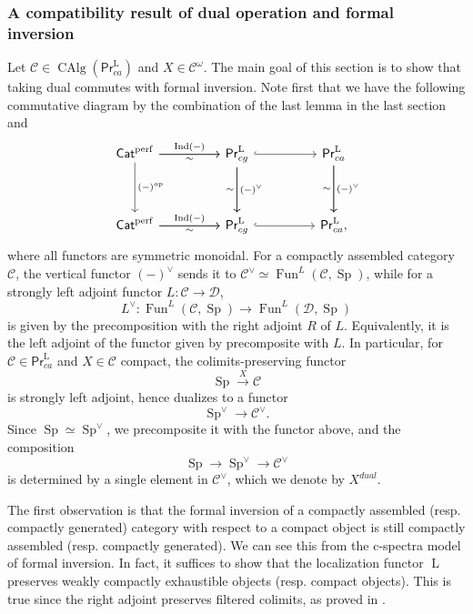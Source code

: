 \documentclass{article}
\theoremstyle{definition}
\newcommand{\on}{\operatorname}
\newcommand{\PrL}{\mathsf{Pr}^\mathrm{L} }
\begin{document}
\subsubsection{A compatibility result of dual operation and formal inversion}\label{compactibility}
Let $\mathcal{C}\in\on{CAlg}(\PrL_{ca})$ and $X\in\mathcal{C}^{\omega}$. The main goal of this section is to show that taking dual commutes with formal inversion. Note first that we have the following commutative diagram by the combination of the last lemma in the last section and \cite[Construction 2.9.21]{KNP}
\[\begin{tikzcd}
	{\mathsf{Cat}^{\on{perf}}} && {\PrL_{cg}} && {\PrL_{ca}} \\
	\\
	{\mathsf{Cat}^{\on{perf}}} && {\PrL_{cg}} && {\PrL_{ca}}
	\arrow["{\on{Ind}(-)}", from=1-1, to=1-3]
	\arrow["\sim"', from=1-1, to=1-3]
	\arrow["{(-)^{op}}", from=1-1, to=3-1]
	\arrow[hook, from=1-3, to=1-5]
	\arrow["{(-)^\vee}", from=1-3, to=3-3]
	\arrow["\sim"', from=1-3, to=3-3]
	\arrow["{(-)^\vee}", from=1-5, to=3-5]
	\arrow["\sim"', from=1-5, to=3-5]
	\arrow["{\on{Ind}(-)}", from=3-1, to=3-3]
	\arrow["\sim"', from=3-1, to=3-3]
	\arrow[hook, from=3-3, to=3-5],
\end{tikzcd}\]
where all functors are symmetric monoidal. For a compactly assembled category $\mathcal{C}$, the vertical functor $(-)^\vee$ sends it to $\mathcal{C}^\vee\simeq\on{Fun}^L(\mathcal{C},\on{Sp})$, while for a strongly left adjoint functor $L:\mathcal{C}\rightarrow\mathcal{D}$, \[L^\vee:\on{Fun}^L(\mathcal{C},\on{Sp})\rightarrow\on{Fun}^L(\mathcal{D},\on{Sp})\] is given by the precomposition with the right adjoint $R$ of $L$. Equivalently, it is the left adjoint of the functor given by precomposite with $L$. In particular, for $\mathcal{C}\in\PrL_{ca}$ and $X\in\mathcal{C}$ compact, the colimits-preserving functor\[
\on{Sp}\xrightarrow{X}\mathcal{C}\]
is strongly left adjoint, hence dualizes to a functor
\[\on{Sp}^\vee\rightarrow\mathcal{C}^\vee.\]
Since $\on{Sp}\simeq\on{Sp}^\vee$, we precomposite it with the functor above, and the composition\[
\on{Sp}\rightarrow\on{Sp}^\vee\rightarrow\mathcal{C}^\vee\]
is determined by a single element in $\mathcal{C}^\vee$, which we denote by $X^{dual}$.


The first observation is that the formal inversion of a compactly assembled (resp. compactly generated) category with respect to a compact object is still compactly assembled (resp. compactly generated). We can see this from the c-spectra model of formal inversion. In fact, it suffices to show that the localization functor $\on{L}$ preserves weakly compactly exhaustible objects (resp. compact objects). This is true since the right adjoint preserves filtered colimits, as proved in \cite[Lemma 1.5.2]{AI}.
\end{document}
